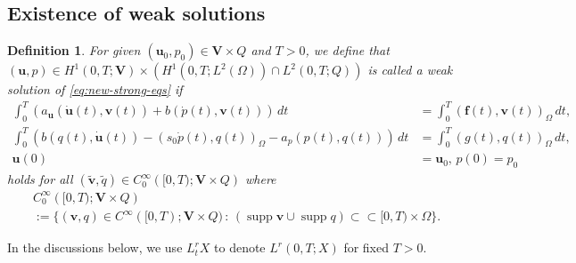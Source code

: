 \documentclass{amsart}
\newtheorem{definition}{Definition}[section]
\newcommand{\algn}[1]{\begin{align} #1 \end{align}}
\newcommand{\LRp}[1]{\left( #1 \right)}
\newcommand{\supp}{\operatorname{supp}}
\begin{document}
\subsection{Existence of weak solutions}\label{Existence of weak solutions}
\begin{definition} 
	For given $(\boldsymbol{u}_0, p_0) \in \boldsymbol{V} \times Q$ and $T>0$, we define that 
	$\LRp{\boldsymbol{u}, p}\in H^1(0,T;\boldsymbol{V}) \times (H^1(0,T;L^2(\Omega))\cap L^2(0,T;Q))$ is called a weak solution of \eqref{eq:new-strong-eqs} if 
	\begin{subequations}
		\label{eq:weak-form-eqs}
	\begin{align}
		\label{eq:weak-form-eq1}
		\int_0^T \LRp{a_{\boldsymbol{u}} \LRp{\dot{\boldsymbol{u}} (t), \boldsymbol{v} (t)} + b \LRp{\dot{p} (t), \boldsymbol{v} (t)}} \, dt &= \int_0^T \LRp{\boldsymbol{f} (t), \boldsymbol{v} (t)}_{\Omega} \, dt, \\
		\label{eq:weak-form-eq2}
		\int_0^T \LRp{b \LRp{q(t), \dot{\boldsymbol{u}} (t)} - \LRp{s_0 \dot{p} (t), q(t)}_{\Omega} - a_p\LRp{ p(t) , q(t)}} \, dt &= \int_0^T \LRp{g(t), q(t)}_{\Omega} \, dt, \\
		\label{eq:weak-form-IC}
		\boldsymbol{u} (0) &= \boldsymbol{u}_0 \text{, } p(0) = p_0
	\end{align}
	\end{subequations}
	holds for all $\LRp{\tilde{\boldsymbol{v}}, \tilde{q}} \in C_0^{\infty} \LRp{[0, T); \boldsymbol{V} \times Q}$ where 
%
\algn{
	\label{eq:spacetime-test-function}
	&C_0^{\infty} \LRp{[0, T); \boldsymbol{V} \times Q} \\
	\nonumber &:=\{ (\boldsymbol{v},q) \in C^{\infty}([0,T); \boldsymbol{V} \times Q) \,:\, (\supp \boldsymbol{v} \cup \supp q) \subset \subset [0,T) \times \Omega \}.
}
\end{definition}
%
In the discussions below, we use $L_t^rX$ to denote $L^r(0,T;X)$ for fixed $T>0$. 
%
\end{document}
